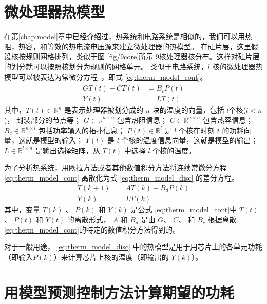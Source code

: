  
 \section{微处理器热模型}\label{sec:therm_model}
在第\ref{chap:model}章中已经介绍过，热系统和电路系统是相似的，我们可以用热阻，热容，和等效的热电流电压源来建立微处理器的热模型。
在硅片层，这里假设核按规则网格排列，类似于图 \ref{fig/9core}所示 $9$核处理器核分布。这样对硅片层的划分就可以按照核划分为规则的网格单元。
类似于电路系统，$l$ 核的微处理器热模型可以被表达为常微分方程~\cite{WangTan:TODAES'13}，即式 \eqref{eq:therm_model_cont}。
\begin{equation}\label{eq:therm_model_cont} 
\begin{split}
G T(t) + C \dot{T}(t) &= B_c P(t)\\
Y(t) &= L T(t)
\end{split}
\end{equation}
其中，$T(t) \in \mathbb{R}^n$ 是表示处理器被划分成的 $n$ 块的温度的向量，包括 $l$个核($l < n$)， 封装部分的节点等；
$G \in \mathbb{R}^{n\times n}$ 包含热阻信息； 
$C \in \mathbb{R}^{n \times n}$ 包含热容信息；
$B_c \in \mathbb{R}^{n \times l}$ 包括功率输入的拓扑信息；
$P(t) \in \mathbb{R}^{l}$ 是 $l$ 个核在时刻 $t$ 的功耗向量，这就是模型的输入；
$Y(t)$ 是 $l$ 个核的温度信息向量，这就是模型的输出；
$L \in \mathbb{R}^{l \times n}$ 是输出选择矩阵，从 $T(t)$ 中选择 $l$ 个核的温度。

为了分析热系统，用欧拉方法或者其他数值积分方法将连续常微分方程 \eqref{eq:therm_model_cont} 离散化为式 \eqref{eq:therm_model_disc} 的差分方程。
\begin{equation}\label{eq:therm_model_disc}
\begin{split}
T(k+1) &= A T(k)+B_d P(k)\\
Y(k) &= L T(k)
\end{split}
\end{equation}
其中，变量 $T(k)$ 、 $P(k)$ 和 $Y(k)$ 是公式 \eqref{eq:therm_model_cont}中
$T(t)$ 、 $P(t)$ 和 $Y(t)$ 的离散形式，  $A$ 和
$B_d$ 是由 $G$、 $C$、 和 $B_c$ 根据离散\eqref{eq:therm_model_cont}的特定的数值积分方法得到的。

对于一般用途， \eqref{eq:therm_model_disc} 中的热模型是用于用芯片上的各单元功耗（即输入$P(k)$）来计算芯片上核的温度（即输出的 $Y(k)$）。

\section{用模型预测控制方法计算期望的功耗}\label{sec:mpc}

